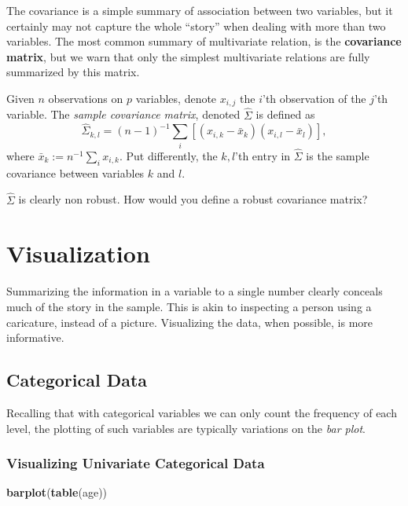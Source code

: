 \documentclass[]{book}
\newenvironment{Shaded}{\begin{snugshade}}{\end{snugshade}}
\newcommand{\KeywordTok}[1]{\textcolor[rgb]{0.13,0.29,0.53}{\textbf{#1}}}
\newcommand{\NormalTok}[1]{#1}
\theoremstyle{definition}
\theoremstyle{definition}
\theoremstyle{definition}
\theoremstyle{remark}
\let\BeginKnitrBlock\begin \let\EndKnitrBlock\end
\begin{document}
The covariance is a simple summary of association between two variables,
but it certainly may not capture the whole ``story'' when dealing with
more than two variables. The most common summary of multivariate
relation, is the \textbf{covariance matrix}, but we warn that only the
simplest multivariate relations are fully summarized by this matrix.

\BeginKnitrBlock{definition}[Sample Covariance Matrix]
\protect\hypertarget{def:unnamed-chunk-83}{}{\label{def:unnamed-chunk-83}
{} }Given \(n\) observations on
\(p\) variables, denote \(x_{i,j}\) the \(i\)'th observation of the
\(j\)'th variable. The \emph{sample covariance matrix}, denoted
\(\hat \Sigma\) is defined as
\[\hat \Sigma_{k,l}=(n-1)^{-1} \sum_i [(x_{i,k}-\bar x_k)(x_{i,l}-\bar x_l)],\]
where \(\bar x_k:=n^{-1} \sum_i x_{i,k}\). Put differently, the
\(k,l\)'th entry in \(\hat \Sigma\) is the sample covariance between
variables \(k\) and \(l\).
\EndKnitrBlock{definition}

\BeginKnitrBlock{remark}
{}\(\hat \Sigma\) is clearly non robust. How
would you define a robust covariance matrix?
\EndKnitrBlock{remark}

\section{Visualization}\label{visualization}

Summarizing the information in a variable to a single number clearly
conceals much of the story in the sample. This is akin to inspecting a
person using a caricature, instead of a picture. Visualizing the data,
when possible, is more informative.

\subsection{Categorical Data}\label{categorical-data-1}

Recalling that with categorical variables we can only count the
frequency of each level, the plotting of such variables are typically
variations on the \emph{bar plot}.

\subsubsection{Visualizing Univariate Categorical
Data}\label{visualizing-univariate-categorical-data}

\begin{Shaded}
\begin{Highlighting}[]
\KeywordTok{barplot}\NormalTok{(}\KeywordTok{table}\NormalTok{(age))}
\end{Highlighting}
\end{Shaded}
\end{document}
